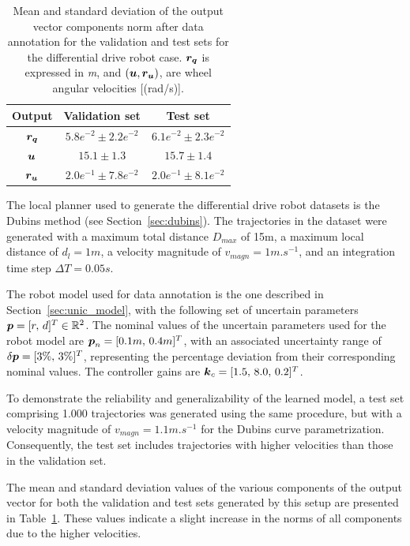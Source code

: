 \begin{table}[t]
    \centering
    \begin{tabular}{ | c | c || c |}
    \hline
      \textbf{Output}  & \textbf{Validation set}  & \textbf{Test set} \\ \hline
    $\boldsymbol{r_q}$ & $5.8e^{-2} \pm 2.2e^{-2}$ & $6.1e^{-2} \pm 2.3e^{-2}$ \\ \hline
    $\boldsymbol{u}$ & $15.1 \pm 1.3$ & $15.7 \pm 1.4$ \\ \hline
    $\boldsymbol{r_u}$ & $2.0e^{-1} \pm 7.8e^{-2}$ & $2.0e^{-1} \pm 8.1e^{-2}$ \\ \hline
\end{tabular}
\caption{
Mean and standard deviation of the output vector components norm after data annotation for the validation and test sets for the differential drive robot case.
$\boldsymbol{r_q}$ is expressed in \emph{m}, and $(\boldsymbol{u}, \boldsymbol{r_u})$, are wheel angular velocities [(rad/s)].}
 \label{tab:datas_stats_unic}
\end{table}

The local planner used to generate the differential drive robot datasets is the Dubins method (see Section~\ref{sec:dubins}).
The trajectories in the dataset were generated with a maximum total distance $D_{max}$ of 15m, a maximum local distance of $d_l = 1m$, a velocity magnitude of $v_{magn} = 1 m.s^{-1}$, and an integration time step $\Delta T = 0.05s$. 

The robot model used for data annotation is the one described in Section~\ref{sec:unic_model}, with the following set of uncertain parameters $\boldsymbol{p} = [r, \, d]^T \in \mathbb{R}^{2}$.
The nominal values of the uncertain parameters used for the robot model are  $\boldsymbol{p}_n = [0.1m, \, 0.4m]^T$, with an associated uncertainty range of $\delta\boldsymbol{p} = [3\%, \, 3\%]^T$, representing the percentage deviation from their corresponding nominal values.
The controller gains are $\boldsymbol{k}_c = [1.5, \, 8.0, \, 0.2]^T$.

To demonstrate the reliability and generalizability of the learned model, a test set comprising 1.000 trajectories was generated using the same procedure, but with a velocity magnitude of $v_{magn} = 1.1 m.s^{-1}$ for the Dubins curve parametrization. 
Consequently, the test set includes trajectories with higher velocities than those in the validation set.

The mean and standard deviation values of the various components of the output vector for both the validation and test sets generated by this setup are presented in Table~\ref{tab:datas_stats_unic}. 
These values indicate a slight increase in the norms of all components due to the higher velocities.

